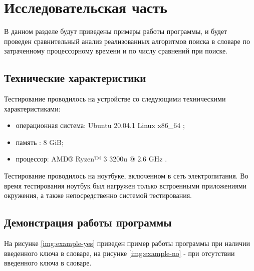 \chapter{Исследовательская часть}

В данном разделе будут приведены примеры работы программы, и будет проведен сравнительный анализ реализованных алгоритмов поиска в словаре по затраченному процессорному времени и по числу сравнений при поиске.

\section{Технические характеристики}

Тестирование проводилось на устройстве со следующими техническими характеристиками:

\begin{itemize}
	\item операционная система: Ubuntu 20.04.1 Linux x86\_64 \cite{linux};
	\item память : 8 GiB;
	\item процессор: AMD® Ryzen™ 3 3200u @ 2.6 GHz \cite{amd}.
\end{itemize}

Тестирование проводилось на ноутбуке, включенном в сеть электропитания. Во время тестирования ноутбук был нагружен только встроенными приложениями окружения, а также непосредственно системой тестирования.

\clearpage

\section{Демонстрация работы программы}

На рисунке \ref{img:example-yes} приведен пример работы программы при наличии введенного ключа в словаре, на рисунке \ref{img:example-no} - при отсутствии введенного ключа в словаре.


